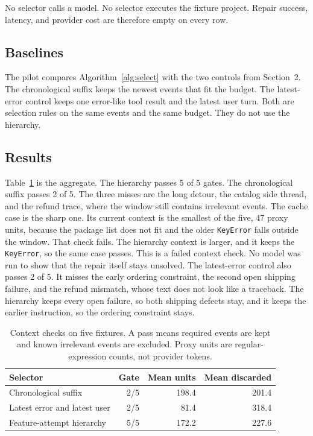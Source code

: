\documentclass[11pt]{article}
\begin{document}
No selector calls a model.
No selector executes the fixture project.
Repair success, latency, and provider cost are therefore empty on every row.

\subsection{Baselines}

The pilot compares Algorithm~\ref{alg:select} with the two controls from Section~2.
The chronological suffix keeps the newest events that fit the budget.
The latest-error control keeps one error-like tool result and the latest user turn.
Both are selection rules on the same events and the same budget.
They do not use the hierarchy.

\subsection{Results}

Table~\ref{tab:gates} is the aggregate.
The hierarchy passes 5 of 5 gates.
The chronological suffix passes 2 of 5.
The three misses are the long detour, the catalog side thread, and the refund trace, where the window still contains irrelevant events.
The cache case is the sharp one.
Its current context is the smallest of the five, 47 proxy units, because the package list does not fit and the older \texttt{KeyError} falls outside the window.
That check fails.
The hierarchy context is larger, and it keeps the \texttt{KeyError}, so the same case passes.
This is a failed context check.
No model was run to show that the repair itself stays unsolved.
The latest-error control also passes 2 of 5.
It misses the early ordering constraint, the second open shipping failure, and the refund mismatch, whose text does not look like a traceback.
The hierarchy keeps every open failure, so both shipping defects stay, and it keeps the earlier instruction, so the ordering constraint stays.

\begin{table}[t]
\centering
\caption{Context checks on five fixtures.
A pass means required events are kept and known irrelevant events are excluded.
Proxy units are regular-expression counts, not provider tokens.}
\label{tab:gates}
\small
\begin{tabular}{@{}lrrr@{}}
\toprule
Selector & Gate & Mean units & Mean discarded \\
\midrule
Chronological suffix & 2/5 & 198.4 & 201.4 \\
Latest error and latest user & 2/5 & 81.4 & 318.4 \\
Feature-attempt hierarchy & 5/5 & 172.2 & 227.6 \\
\bottomrule
\end{tabular}
\end{table}
\end{document}
